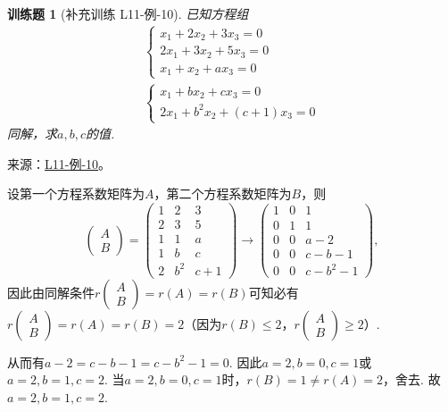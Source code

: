 \documentclass[12pt,fontset=fandol]{ctexart}
\newtheorem{exercise}{训练题}[section]
\begin{document}
\begin{exercise}[补充训练 L11-例-10]\label{prob:L11-例-10}
已知方程组\begin{gather*}
        \begin{cases}
            x_1+2x_2+3x_3=0  \\
            2x_1+3x_2+5x_3=0 \\
            x_1+x_2+ax_3=0
        \end{cases} \\
        \begin{cases}
            x_1+bx_2+cx_3=0 \\
            2x_1+b^2x_2+(c+1)x_3=0
        \end{cases}
    \end{gather*}
    同解，求$a,b,c$的值.
\end{exercise}
\noindent 来源：\href{https://github.com/yhwu-is/Linear-Algebra-Left-Undone/blob/new/%E8%AE%B2%E4%B9%89/%E4%B8%93%E9%A2%98/11%20%E6%9C%9D%E8%8A%B1%E5%A4%95%E6%8B%BE.tex}{L11-例-10}。
\begin{solve}
设第一个方程系数矩阵为$A$，第二个方程系数矩阵为$B$，则
    \[\begin{pmatrix}
            A \\ B
        \end{pmatrix}=\begin{pmatrix}
            1 & 2 & 3 \\ 2 & 3 & 5 \\ 1 & 1 & a \\ 1 & b & c \\ 2 & b^2 & c+1
        \end{pmatrix}\to\begin{pmatrix}
            1 & 0 & 1 \\ 0 & 1 & 1 \\ 0 & 0 & a-2 \\ 0 & 0 & c-b-1 \\ 0 & 0 & c-b^2-1
        \end{pmatrix},\]
    因此由同解条件$r\begin{pmatrix}
            A \\ B
        \end{pmatrix}=r(A)=r(B)$可知必有$r\begin{pmatrix}
            A \\ B
        \end{pmatrix}=r(A)=r(B)=2$（因为$r(B)\leqslant 2$，$r\begin{pmatrix}
            A \\ B
        \end{pmatrix}\geqslant 2$）.

    从而有$a-2=c-b-1=c-b^2-1=0$. 因此$a=2,b=0,c=1$或$a=2,b=1,c=2$. 当$a=2,b=0,c=1$时，$r(B)=1\neq r(A)=2$，舍去. 故$a=2,b=1,c=2$.
\end{solve}
\end{document}
